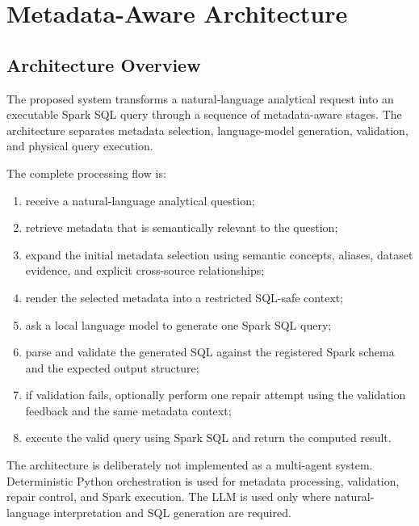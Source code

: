 \section{Metadata-Aware Architecture}
\label{sec:architecture}

\subsection{Architecture Overview}

The proposed system transforms a natural-language analytical request into an
executable Spark SQL query through a sequence of metadata-aware stages. The
architecture separates metadata selection, language-model generation,
validation, and physical query execution.

The complete processing flow is:

\begin{enumerate}

    \item receive a natural-language analytical question;

    \item retrieve metadata that is semantically relevant to the question;

    \item expand the initial metadata selection using semantic concepts,
    aliases, dataset evidence, and explicit cross-source relationships;

    \item render the selected metadata into a restricted SQL-safe context;

    \item ask a local language model to generate one Spark SQL query;

    \item parse and validate the generated SQL against the registered Spark
    schema and the expected output structure;

    \item if validation fails, optionally perform one repair attempt using the
    validation feedback and the same metadata context;

    \item execute the valid query using Spark SQL and return the computed
    result.

\end{enumerate}

The architecture is deliberately not implemented as a multi-agent system.
Deterministic Python orchestration is used for metadata processing,
validation, repair control, and Spark execution. The LLM is used only where
natural-language interpretation and SQL generation are required.



